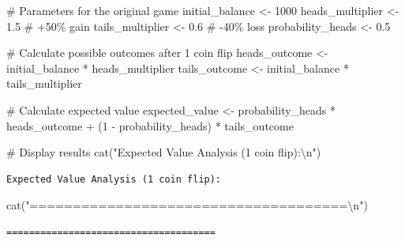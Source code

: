 \documentclass[
  letterpaper,
  DIV=11,
  numbers=noendperiod]{scrartcl}
\newenvironment{Shaded}{\begin{snugshade}}{\end{snugshade}}
\newcommand{\AttributeTok}[1]{\textcolor[rgb]{0.40,0.45,0.13}{#1}}
\newcommand{\CommentTok}[1]{\textcolor[rgb]{0.37,0.37,0.37}{#1}}
\newcommand{\DecValTok}[1]{\textcolor[rgb]{0.68,0.00,0.00}{#1}}
\newcommand{\FloatTok}[1]{\textcolor[rgb]{0.68,0.00,0.00}{#1}}
\newcommand{\FunctionTok}[1]{\textcolor[rgb]{0.28,0.35,0.67}{#1}}
\newcommand{\NormalTok}[1]{\textcolor[rgb]{0.00,0.23,0.31}{#1}}
\newcommand{\OtherTok}[1]{\textcolor[rgb]{0.00,0.23,0.31}{#1}}
\newcommand{\SpecialCharTok}[1]{\textcolor[rgb]{0.37,0.37,0.37}{#1}}
\newcommand{\StringTok}[1]{\textcolor[rgb]{0.13,0.47,0.30}{#1}}
\begin{document}
\begin{Shaded}
\begin{Highlighting}[]
\CommentTok{\# Parameters for the original game}
\NormalTok{initial\_balance }\OtherTok{\textless{}{-}} \DecValTok{1000}
\NormalTok{heads\_multiplier }\OtherTok{\textless{}{-}} \FloatTok{1.5}  \CommentTok{\# +50\% gain}
\NormalTok{tails\_multiplier }\OtherTok{\textless{}{-}} \FloatTok{0.6}  \CommentTok{\# {-}40\% loss}
\NormalTok{probability\_heads }\OtherTok{\textless{}{-}} \FloatTok{0.5}

\CommentTok{\# Calculate possible outcomes after 1 coin flip}
\NormalTok{heads\_outcome }\OtherTok{\textless{}{-}}\NormalTok{ initial\_balance }\SpecialCharTok{*}\NormalTok{ heads\_multiplier}
\NormalTok{tails\_outcome }\OtherTok{\textless{}{-}}\NormalTok{ initial\_balance }\SpecialCharTok{*}\NormalTok{ tails\_multiplier}

\CommentTok{\# Calculate expected value}
\NormalTok{expected\_value }\OtherTok{\textless{}{-}}\NormalTok{ probability\_heads }\SpecialCharTok{*}\NormalTok{ heads\_outcome }\SpecialCharTok{+}\NormalTok{ (}\DecValTok{1} \SpecialCharTok{{-}}\NormalTok{ probability\_heads) }\SpecialCharTok{*}\NormalTok{ tails\_outcome}

\CommentTok{\# Display results}
\FunctionTok{cat}\NormalTok{(}\StringTok{"Expected Value Analysis (1 coin flip):}\SpecialCharTok{\textbackslash{}n}\StringTok{"}\NormalTok{)}
\end{Highlighting}
\end{Shaded}

\begin{verbatim}
Expected Value Analysis (1 coin flip):
\end{verbatim}

\begin{Shaded}
\begin{Highlighting}[]
\FunctionTok{cat}\NormalTok{(}\StringTok{"=====================================}\SpecialCharTok{\textbackslash{}n}\StringTok{"}\NormalTok{)}
\end{Highlighting}
\end{Shaded}

\begin{verbatim}
=====================================
\end{verbatim}

\begin{Shaded}
\end{Shaded}
\end{document}

